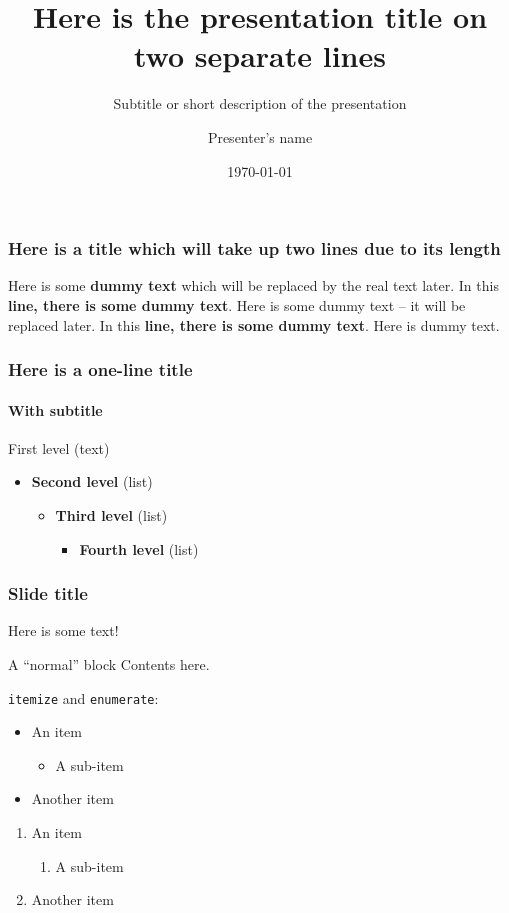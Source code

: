 \documentclass[english]{beamer}
\title[Here is the presentation title]{Here is the presentation title on two separate lines}
\subtitle{Subtitle or short description of the presentation}
\author{Presenter's name}
\date{\today}
\begin{document}
\maketitle

\begin{frame}
	\frametitle{Here is a title which will take up two lines due to its length}

	Here is some \textbf{dummy text} which will be replaced by the real text later.
	In this \textbf{line, there is some dummy text}.
	Here is some dummy text – it will be replaced later.
	In this \textbf{line, there is some dummy text}.
	Here is dummy text.
\end{frame}

\begin{frame}
	\frametitle{Here is a one-line title}
	\framesubtitle{With subtitle}

	First level (text)
	\begin{itemize}
		\item \textbf{Second level} (list)
		\begin{itemize}
			\item \textbf{Third level} (list)
			\begin{itemize}
				\item \textbf{Fourth level} (list)
			\end{itemize}
		\end{itemize}
	\end{itemize}
\end{frame}

\begin{frame}
	\frametitle{Slide title}

	Here is some text!

	\begin{block}{A “normal” block}
		Contents here.
	\end{block}

	\texttt{itemize} and \texttt{enumerate}:
	\begin{itemize}
		\item An item
		\begin{itemize}
			\item A sub-item
		\end{itemize}
		\item Another item
	\end{itemize}
	\begin{enumerate}
		\item An item
		\begin{enumerate}
			\item A sub-item
		\end{enumerate}
		\item Another item
	\end{enumerate}
\end{frame}
\end{document}
